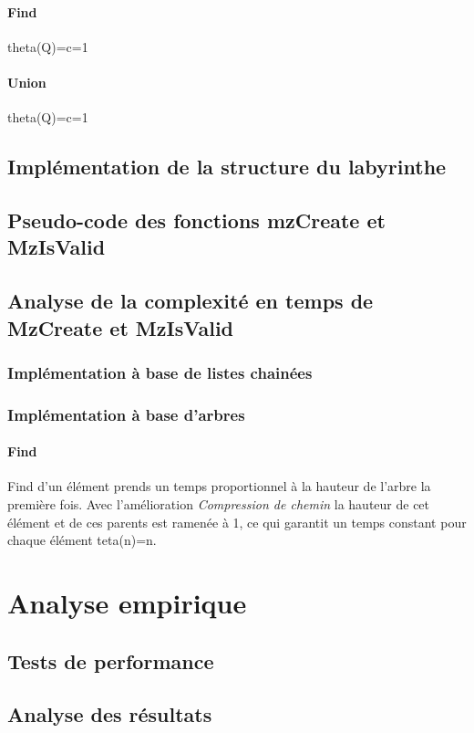 \documentclass[11pt]{article}
\begin{document}
		\paragraph{Find}
		theta(Q)=c=1		
		\paragraph{Union}
		theta(Q)=c=1
	\subsection{Implémentation de la structure du labyrinthe}
	\subsection{Pseudo-code des fonctions mzCreate et MzIsValid}
	\subsection{Analyse de la complexité en temps de MzCreate et MzIsValid}
		\subsubsection{Implémentation à base de listes chainées}
		\subsubsection{Implémentation à base d'arbres}
			\paragraph{Find}		
		Find d'un élément prends un temps proportionnel à la hauteur de l'arbre la première fois. Avec l'amélioration \textit{Compression de chemin} la hauteur de cet élément et de ces parents est ramenée à 1, ce qui garantit un temps constant pour chaque élément teta(n)=n.

\section{Analyse empirique}
	\subsection{Tests de performance}
	\subsection{Analyse des résultats}
\end{document}
